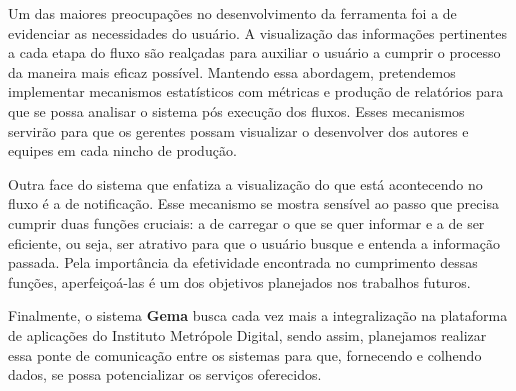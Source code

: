 
Um das maiores preocupações no desenvolvimento da ferramenta foi a de evidenciar as necessidades do usuário. A visualização das informações pertinentes a cada etapa do fluxo são realçadas para auxiliar o usuário a cumprir o processo da maneira mais eficaz possível. Mantendo essa abordagem, pretendemos implementar mecanismos estatísticos com métricas e produção de relatórios para que se possa analisar o sistema pós execução dos fluxos. Esses mecanismos servirão para que os gerentes possam visualizar o desenvolver dos autores e equipes em cada nincho de produção.
 
Outra face do sistema que enfatiza a visualização do que está acontecendo no fluxo é a de notificação. Esse mecanismo se mostra sensível ao passo que precisa cumprir duas funções cruciais: a de carregar o que se quer informar e a de ser eficiente, ou seja, ser atrativo para que o usuário busque e entenda a informação passada. Pela importância da efetividade encontrada no cumprimento dessas funções, aperfeiçoá-las é um dos objetivos planejados nos trabalhos futuros. 
 
Finalmente, o sistema \textbf{Gema} busca cada vez mais a integralização na plataforma de aplicações do Instituto Metrópole Digital, sendo assim, planejamos realizar essa ponte de comunicação entre os sistemas para que, fornecendo e colhendo dados, se possa potencializar os serviços oferecidos.
 
 
 
 
 
